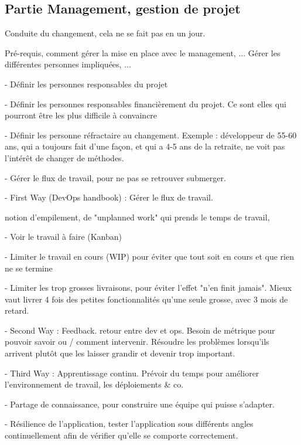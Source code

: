 
\subsection{Partie Management, gestion de projet}


Conduite du changement, cela ne se fait pas en un jour.

Pré-requis, comment gérer la mise en place avec le management, ... Gérer les différentes personnes impliquées, ...

- Définir les personnes responsables du projet

- Définir les personnes responsables financièrement du projet. Ce sont elles qui pourront être les plus difficile à convaincre

- Définir les personne réfractaire au changement. Exemple : développeur de 55-60 ans, qui a toujours fait d'une façon, et qui a 4-5 ans de la retraite, ne voit pas l'intérêt de changer de méthodes.

- Gérer le flux de travail, pour ne pas se retrouver submerger.

- First Way (DevOps handbook) : Gérer le flux de travail. 

notion d'empilement, de "unplanned work" qui prends le temps de travail,

- Voir le travail à faire (Kanban)

- Limiter le travail en cours (WIP) pour éviter que tout soit en cours et que rien ne se termine

- Limiter les trop grosses livraisons, pour éviter l'effet "n'en finit jamais". Mieux vaut livrer 4 fois des petites fonctionnalités qu'une seule grosse, avec 3 mois de retard.

- Second Way : Feedback. retour entre dev et ops. Besoin de métrique pour pouvoir savoir ou / comment intervenir. Résoudre les problèmes lorsqu'ils arrivent plutôt que les laisser grandir et devenir trop important.

- Third Way : Apprentissage continu. Prévoir du temps pour améliorer l'environnement de travail, les déploiements  \& co.

- Partage de connaissance, pour construire une équipe qui puisse s'adapter.

- Résilience de l'application, tester l'application sous différents angles continuellement afin de vérifier qu'elle se comporte correctement.

